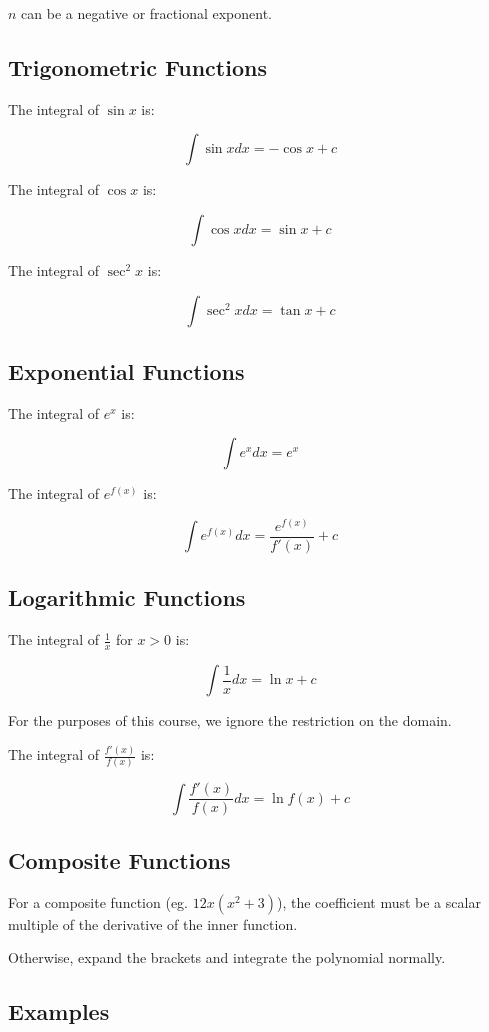 \documentclass[a4paper,11pt]{article}
\begin{document}
$n$ can be a negative or fractional exponent.


\subsection{Trigonometric Functions}

The integral of $\sin{x}$ is:

$$
\int \sin{x} dx = -\cos{x} + c
$$

The integral of $\cos{x}$ is:

$$
\int \cos{x} dx = \sin{x} + c
$$

The integral of $\sec^2{x}$ is:

$$
\int \sec^2{x} dx = \tan{x} + c
$$


\subsection{Exponential Functions}

The integral of $e^x$ is:

$$
\int e^x dx = e^x
$$

The integral of $e^{f(x)}$ is:

$$
\int e^{f(x)} dx = \frac{e^{f(x)}}{f'(x)} + c
$$


\subsection{Logarithmic Functions}

The integral of $\frac{1}{x}$ for $x > 0$ is:

$$
\int \frac{1}{x} dx = \ln{x} + c
$$

For the purposes of this course, we ignore the restriction on the domain.

The integral of $\frac{f'(x)}{f(x)}$ is:

$$
\int \frac{f'(x)}{f(x)} dx = \ln{f(x)} + c
$$


\subsection{Composite Functions}

For a composite function (eg. $12x(x^2 + 3)$), the coefficient must be a scalar
multiple of the derivative of the inner function.

Otherwise, expand the brackets and integrate the polynomial normally.


\subsection{Examples}
\end{document}
